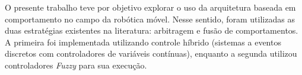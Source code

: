 \begin{resumo}

O presente trabalho teve por objetivo explorar o uso da arquitetura baseada em comportamento no
campo da robótica móvel. Nesse sentido, foram utilizadas as duas estratégias existentes 
na literatura: arbitragem e fusão de comportamentos. A primeira foi implementada utilizando
controle híbrido (sistemas a eventos discretos com controladores de variáveis contínuas), 
enquanto a segunda utilizou controladores \textit{Fuzzy} para sua execução. 

\end{resumo}